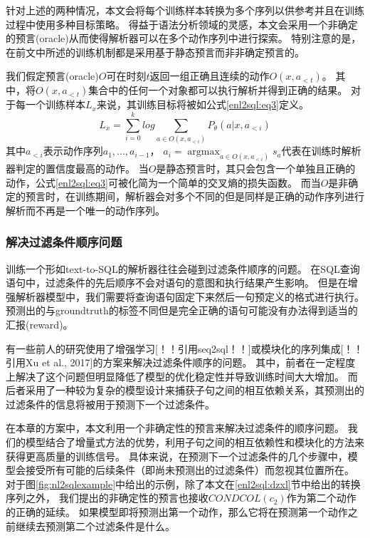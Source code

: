针对上述的两种情况，本文会将每个训练样本转换为多个序列以供参考并且在训练过程中使用多种目标策略。
得益于语法分析领域的灵感，本文会采用一个非确定的预言(oracle)从而使得解析器可以在多个动作序列中进行探索。
特别注意的是，在前文中所述的训练机制都是采用基于静态预言而非非确定预言的。

我们假定预言(oracle)$O$可在时刻$t$返回一组正确且连续的动作$O(x,a_{<t})$。
其中，将$O(x,a_{<t})$集合中的任何一个对象都可以执行解析并得到正确的结果。
对于每一个训练样本$L_x$来说，其训练目标将被如公式\ref{enl2sql:eq3}定义。
\begin{equation}
  \label{enl2sql:eq3}
  L_x = \sum_{i=0}^k log \sum_{a\in O(x,a_{<i})} P_{\theta}(a|x,a_{<i})
\end{equation}
其中$a_{<i}$表示动作序列$a_{1},...,a_{i-1}$，
$a_{i} = \mathop{\arg\max}_{a\in O(x,a_{<i})} s_a $代表在训练时解析器判定的置信度最高的动作。
当$O$是静态预言时，其只会包含一个单独且正确的动作，公式\ref{enl2sql:eq3}可被化简为一个简单的交叉熵的损失函数。
而当$O$是非确定的预言时，在训练期间，解析器会对多个不同的但是同样是正确的动作序列进行解析而不再是一个唯一的动作序列。

\subsubsection{解决过滤条件顺序问题}
\label{enl2sql:om}

训练一个形如text-to-SQL的解析器往往会碰到过滤条件顺序的问题。
在SQL查询语句中，过滤条件的先后顺序不会对语句的意图和执行结果产生影响。
但是在增强解析器模型中，我们需要将查询语句固定下来然后一句预定义的格式进行执行。
预测出的与groundtruth的标签不同但是完全正确的语句可能没有办法得到适当的汇报(reward)。

有一些前人的研究使用了增强学习[！！引用seq2sql！！]或模块化的序列集成[！！引用Xu et al., 2017]的方案来解决过滤条件顺序的问题。
其中，前者在一定程度上解决了这个问题但明显降低了模型的优化稳定性并导致训练时间大大增加。
而后者采用了一种较为复杂的模型设计来捕获子句之间的相互依赖关系，其预测出的过滤条件的信息将被用于预测下一个过滤条件。

在本章的方案中，本文利用一个非确定性的预言来解决过滤条件的顺序问题。
我们的模型结合了增量式方法的优势，利用子句之间的相互依赖性和模块化的方法来获得更高质量的训练信号。
具体来说，在预测下一个过滤条件的几个步骤中，模型会接受所有可能的后续条件（即尚未预测出的过滤条件）而忽视其位置所在。
对于图\ref{fig:nl2sqlexample}中给出的示例，除了本文在\ref{enl2sql:dzxl}节中给出的转换序列之外，
我们提出的非确定性的预言也接收$CONDCOL(c_2)$作为第二个动作的正确的延续。
如果模型即将预测出第一个动作，那么它将在预测第一个动作之前继续去预测第二个过滤条件是什么。
